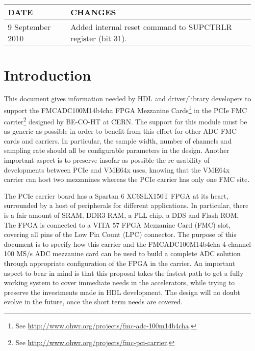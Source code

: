 \documentclass{article}
\begin{document}
\begin{table}[htbp]
  \centering
  \begin{tabularx}{\textwidth}{|l|X|}
    \hline
    \textbf{DATE} & \textbf{CHANGES} \\
    \hline
    \hline
    9 September 2010 & Added internal reset command to SUPCTRLR register (bit 31).\\
    \hline
  \end{tabularx}
\end{table}

\pagebreak

\tableofcontents{}

\pagebreak

\section{Introduction}
This document gives information needed by HDL and driver/library developers to support the FMCADC100M14b4cha FPGA Mezzanine Cards\footnote{See \href{http://www.ohwr.org/projects/fmc-adc-100m14b4cha}{http://www.ohwr.org/projects/fmc-adc-100m14b4cha}.} in the PCIe FMC carrier\footnote{See \href{http://www.ohwr.org/projects/fmc-pci-carrier}{http://www.ohwr.org/projects/fmc-pci-carrier}.} designed by BE-CO-HT at CERN. The support for this module must be as generic as possible in order to benefit from this effort for other ADC FMC cards and carriers. In particular, the sample width, number of channels and sampling rate should all be configurable parameters in the design. Another important aspect is to preserve insofar as possible the re-usability of developments between PCIe and VME64x uses, knowing that the VME64x carrier can host two mezzanines whereas the PCIe carrier has only one FMC site.

The PCIe carrier board has a Spartan 6 XC6SLX150T FPGA at its heart, surrounded by a host of peripherals for different applications. In particular, there is a fair amount of SRAM, DDR3 RAM, a PLL chip, a DDS and Flash ROM. The FPGA is connected to a VITA 57 FPGA Mezzanine Card (FMC) slot, covering all pins of the Low Pin Count (LPC) connector. The purpose of this document is to specify how this carrier and the FMCADC100M14b4cha 4-channel 100 MS/s ADC mezzanine card can be used to build a complete ADC solution through appropriate configuration of the FPGA in the carrier. An important aspect to bear in mind is that this proposal takes the fastest path to get a fully working system to cover immediate needs in the accelerators, while trying to preserve the investments made in HDL development. The design will no doubt evolve in the future, once the short term needs are covered.
\end{document}
